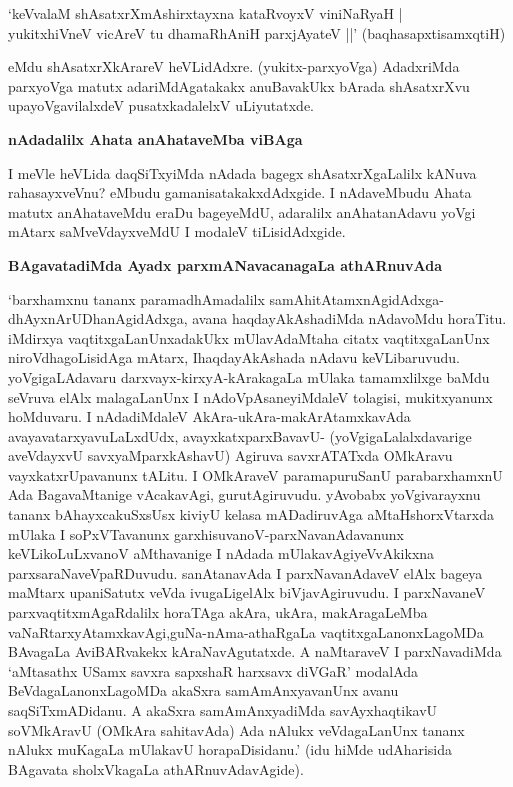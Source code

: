 \begin{shloka}
`keVvalaM shAsatxrXmAshirxtayxna kataRvoyxV viniNaRyaH |\\\label{164}
yukitxhiVneV vicAreV tu dhamaRhAniH parxjAyateV ||' \hfill{(baqhasapxtisamxqtiH)}
\end{shloka}

\noindent
eMdu shAsatxrXkArareV heVLidAdxre. (yukitx-parxyoVga) AdadxriMda parxyoVga matutx adariMdAgatakakx anuBavakUkx bArada shAsatxrXvu upayoVgavilalxdeV pusatxkadalelxV uLiyutatxde.

\eject

{\bigskip
\noindent
{\large\bf nAdadalilx Ahata anAhataveMba viBAga}}\label{page164}
\medskip

\noindent
I meVle heVLida daqSiTxyiMda nAdada bagegx shAsatxrXgaLalilx kANuva rahasayxveVnu? eMbudu gama\-nisa\-takakxdAdxgide. I nAdaveMbudu Ahata matutx anAhataveMdu eraDu bageyeMdU, adaralilx anA\-hata\-nAdavu yoVgi mAtarx saMveVdayxveMdU I modaleV tiLisidAdxgide.

{\bigskip
\noindent
{\large\bf BAgavatadiMda Ayadx parxmANavacanagaLa athARnuvAda}}\label{page164}
\medskip

\noindent
`barxhamxnu tananx paramadhAmadalilx samAhitAtamxnAgidAdxga- dhAyxnArUDhanAgidAdxga, avana haqdayA\-kAsha\-diMda nAdavoMdu horaTitu. iMdirxya vaqtitxgaLanUnx\break adakUkx mUlavAdaMtaha citatx vaqtitx\-gaLanUnx niroVdhagoLisidAga mAtarx, I\break haqdayA\-kAshada nAdavu keVLibaruvudu. yoVgigaLAdavaru darxvayx-\-kirxyA-kAraka\-gaLa mUlaka tamamx\-lilxge baMdu seVruva elAlx malagaLanUnx I nAdoVpAsane\-yiMdaleV tola\-gisi, mukitxyanunx hoMduvaru. I nAdadiMdaleV AkAra\--ukAra\break-makArAtamxkavAda avayava\-tarxyavuLaLxdUdx, avayxkatxparxBavavU- (yoVgigaLalalx\-dava\-rige aveVdayxvU savxyaMparxkAshavU) Agiruva savxrA\-TATxda OMkAravu vayxkatxrUpa\-vanunx tALitu. I OMkAraveV paramapuruSanU parabarxhamxnU Ada BagavaMta\-nige vAcaka\-vAgi, gurutAgiruvudu. yAvobabx yoVgivarayxnu tananx bAhayxcakuSxsUsx kiviyU kelasa mADadiruvAga aMtaHshorxVtarxda mUlaka I soPxVTavanunx garxhisuvanoV-\break parxNavanAdavanunx keVLikoLuLx\-vanoV aMthavanige I nAdada mUlakavAgiyeV\break vAkikxna parxsaraNaveVpaRDuvudu. sanAtanavAda I parxNava\-nAdaveV elAlx bageya maMtarx upaniSatutx veVda ivugaLigelAlx biVjavAgiruvudu. I parxNa\-vaneV parxvaqtitx\-mAgaRdalilx horaTAga akAra, ukAra, makAragaLeMba vaNaRtarxyAtamxkavAgi,\break guNa-nAma-\-athaR\-gaLa vaqtitxgaLanonxLagoMDa BAvagaLa AviBARvakekx kAraNa\-vAgu\-tatxde. A naMtaraveV I parxNavadiMda \-`aMtasathx USamx savxra sapxshaR harxsavx diVGaR' moda\-lAda BeVdagaLanonxLagoMDa akaSxra samAmAnxyavanUnx avanu saqSiTxmADidanu. A akaSxra samAmAnxyadiMda savAyxhaqtikavU soVMkAravU (OMkAra sahitavAda) Ada nAlukx veVdagaLanUnx tananx nAlukx muKagaLa mUlakavU horapaDisidanu.' (idu hiMde udAharisida BAgavata sholxVkagaLa athARnuvAdavAgide).

